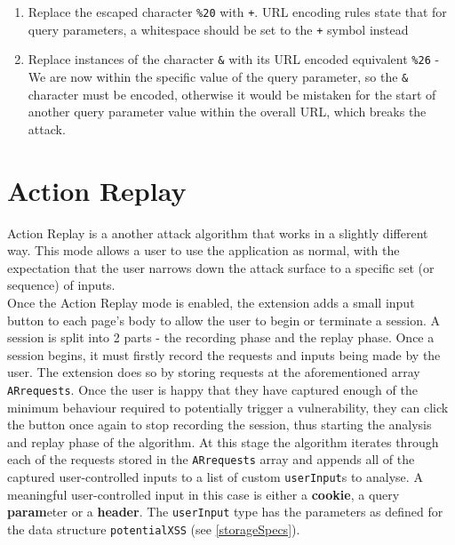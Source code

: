 \begin{enumerate}
	\item Replace the escaped character \texttt{\%20} with \texttt{+}. URL encoding rules state that for query parameters, a whitespace should be set to the \texttt{+} symbol instead
	
	\item Replace instances of the character \texttt{\&} with its URL encoded equivalent \texttt{\%26} - We are now within the specific value of the query parameter, so the \texttt{\&} character must be encoded, otherwise it would be mistaken for the start of another query parameter value within the overall URL, which breaks the attack.
\end{enumerate} 

\section{Action Replay} \label{actionReplay}

Action Replay is a another attack algorithm that works in a slightly different way. This mode allows a user to use the application as normal, with the expectation that the user narrows down the attack surface to a specific set (or sequence) of inputs. \\

Once the Action Replay mode is enabled, the extension adds a small input button to each page's body to allow the user to begin or terminate a session. A session is split into 2 parts - the recording phase and the replay phase. Once a session begins, it must firstly record the requests and inputs being made by the user. The extension does so by storing requests at the aforementioned array \texttt{ARrequests}. Once the user is happy that they have captured enough of the minimum behaviour required to potentially trigger a vulnerability, they can click the button once again to stop recording the session, thus starting the analysis and replay phase of the algorithm. At this stage the algorithm iterates through each of the requests stored in the \texttt{ARrequests} array and appends all of the captured user-controlled inputs to a list of custom \texttt{userInput}s to analyse. A meaningful user-controlled input in this case is either a \textbf{cookie}, a query \textbf{param}eter or a \textbf{header}. The \texttt{userInput} type has the parameters as defined for the data structure \texttt{potentialXSS} (see \ref{storageSpecs}). \\

